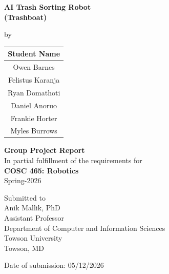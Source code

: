 \documentclass[12pt]{article}
\begin{document}
\begin{titlepage}
\centering

\vspace*{1cm}

{\Large \textbf{AI Trash Sorting Robot\\(Trashboat)}}

{\normalsize by} \\[0.5cm]

\renewcommand{\arraystretch}{1.5}
\begin{tabular}{|c|}
\hline
\centering \textbf{Student Name} \tabularnewline
\hline
Owen Barnes\\ \hline
Felistus Karanja\\ \hline
Ryan Domathoti\\ \hline
Daniel Anoruo\\ \hline
Frankie Horter\\ \hline
Myles Burrows\\ \hline
\end{tabular}

\vspace{0.75cm}

{\large \textbf{Group Project Report}} \\[0.25cm]

In partial fulfillment of the requirements for \\[0.5cm]

{\large \textbf{COSC 465: Robotics}} \\
Spring-2026

\vfill

\begin{flushright}
Submitted to \\
Anik Mallik, PhD \\
Assistant Professor \\
Department of Computer and Information Sciences \\
Towson University \\
Towson, MD
\end{flushright}

\centering
Date of submission: 05/12/2026
\end{titlepage}


\end{document}
